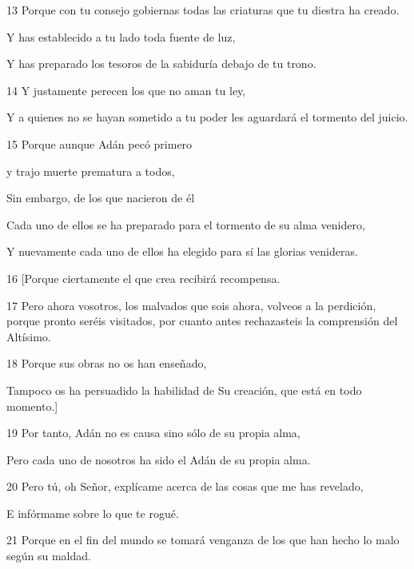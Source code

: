 \par 13 Porque con tu consejo gobiernas todas las criaturas que tu diestra ha creado.

Y has establecido a tu lado toda fuente de luz,

Y has preparado los tesoros de la sabiduría debajo de tu trono.

\par 14 Y justamente perecen los que no aman tu ley,

Y a quienes no se hayan sometido a tu poder les aguardará el tormento del juicio.

\par 15 Porque aunque Adán pecó primero

\par y trajo muerte prematura a todos,

\par Sin embargo, de los que nacieron de él

\par Cada uno de ellos se ha preparado para el tormento de su alma venidero,

\par Y nuevamente cada uno de ellos ha elegido para sí las glorias venideras.

\par 16 [Porque ciertamente el que crea recibirá recompensa.

\par 17 Pero ahora vosotros, los malvados que sois ahora, volveos a la perdición, porque pronto seréis visitados, por cuanto antes rechazasteis la comprensión del Altísimo.

\par 18 Porque sus obras no os han enseñado,

\par Tampoco os ha persuadido la habilidad de Su creación, que está en todo momento.]

\par 19 Por tanto, Adán no es causa sino sólo de su propia alma,

\par Pero cada uno de nosotros ha sido el Adán de su propia alma.

\par 20 Pero tú, oh Señor, explícame acerca de las cosas que me has revelado,

\par E infórmame sobre lo que te rogué.

\par 21 Porque en el fin del mundo se tomará venganza de los que han hecho lo malo según su maldad.

